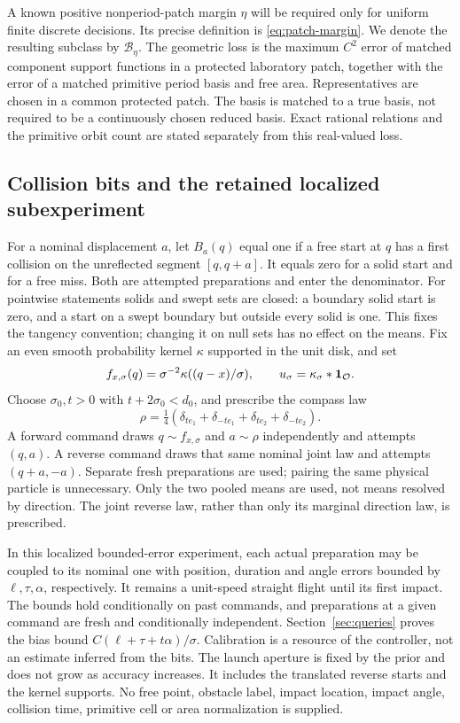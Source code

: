 A known positive nonperiod-patch margin $\eta$ will be required only
for uniform finite discrete decisions. Its precise definition is
\eqref{eq:patch-margin}. We denote the resulting subclass by
$\mathcal B_\eta$. The geometric loss is the maximum $C^2$ error of
matched component support functions in a protected laboratory patch,
together with the error of a matched primitive period basis and free
area. Representatives are chosen in a common protected patch. The
basis is matched to a true basis, not required to be a continuously
chosen reduced basis. Exact rational relations and the primitive orbit
count are stated separately from this real-valued loss.

\subsection{Collision bits and the retained localized subexperiment}
For a nominal displacement $a$, let $B_a(q)$ equal one if a free start
at $q$ has a first collision on the unreflected segment $[q,q+a]$.
It equals zero for a solid start and for a free miss. Both are attempted
preparations and enter the denominator. For pointwise statements solids
and swept sets are closed: a boundary solid start is zero, and a start
on a swept boundary but outside every solid is one. This fixes the
tangency convention; changing it on null sets has no effect on the means.
Fix an even smooth probability kernel $\kappa$ supported in the unit disk,
and set
\[
 f_{x,\sigma}(q)=\sigma^{-2}\kappa((q-x)/\sigma),\qquad
 u_\sigma=\kappa_\sigma*\mathbf 1_\mathcal O.
\]
Choose $\sigma_0,t>0$ with $t+2\sigma_0<d_0$, and prescribe the compass
law
\begin{equation}\label{eq:compass}
 \rho=\tfrac14(\delta_{te_1}+\delta_{-te_1}
                         +\delta_{te_2}+\delta_{-te_2}).
\end{equation}
A forward command draws $q\sim f_{x,\sigma}$ and $a\sim\rho$
independently and attempts $(q,a)$. A reverse command draws that same
nominal joint law and attempts $(q+a,-a).$ Separate fresh preparations
are used; pairing the same physical particle is unnecessary. Only the
two pooled means are used, not means resolved by direction. The joint
reverse law, rather than only its marginal direction law, is prescribed.

In this localized bounded-error experiment, each actual preparation may be coupled to its nominal one with position,
duration and angle errors bounded by $\ell,\tau,\alpha$, respectively.
It remains a unit-speed straight flight until its first impact. The
bounds hold conditionally on past commands, and preparations at a given
command are fresh and conditionally independent. Section~\ref{sec:queries}
proves the bias bound $C(\ell+\tau+t\alpha)/\sigma$. Calibration is a
resource of the controller, not an estimate inferred from the bits.
The launch aperture is fixed by the prior and does not grow as accuracy
increases. It includes the translated reverse starts and the kernel
supports. No free point, obstacle label, impact location, impact angle,
collision time, primitive cell or area normalization is supplied.
